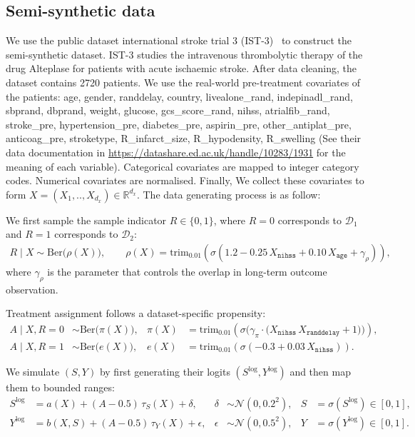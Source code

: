 \documentclass{article}
\theoremstyle{plain}
\theoremstyle{definition}
\theoremstyle{remark}
\newcommand{\1}{\mathds{1}}                %
\begin{document}
\subsection{Semi-synthetic data}
\label{app:semi-synthetic}
We use the public dataset international stroke trial 3 (IST-3)~\cite{Sandercock.2008-IST} to construct the semi-synthetic dataset. IST-3 studies the intravenous thrombolytic therapy of the drug Alteplase for patients with acute ischaemic stroke. After data cleaning, the dataset contains 2720 patients. We use the real-world pre-treatment covariates of the patients: age, gender, randdelay, country, livealone\_rand, indepinadl\_rand, sbprand, dbprand, weight, glucose, gcs\_score\_rand, nihss, atrialfib\_rand, stroke\_pre, hypertension\_pre, diabetes\_pre, aspirin\_pre, other\_antiplat\_pre, anticoag\_pre, stroketype, R\_infarct\_size, R\_hypodensity, R\_swelling (See their data documentation in \href{https://datashare.ed.ac.uk/handle/10283/1931}{https://datashare.ed.ac.uk/handle/10283/1931} for the meaning of each variable). Categorical covariates are mapped to integer category codes. Numerical covariates are normalised. Finally, We collect these covariates to form $X=(X_1,..,X_{d_x}) \in \mathbb{R}^{d_x}$. The data generating process is as follow:

We first sample the sample indicator $R\in\{0,1\}$, where $R=0$ corresponds to $\mathcal D_1$ and $R=1$ corresponds to $\mathcal D_2$:
\begin{align}
  R \mid X \sim \mathrm{Ber}\big(\rho(X)\big),
  \qquad
  \rho(X)=\mathrm{trim}_{0.01}\!\left(\sigma\!\left(1.2 - 0.25\,X_{\texttt{nihss}} + 0.10\,X_{\texttt{age}} + \gamma_\rho\right)\right),
\end{align}
where $\gamma_\rho$ is the parameter that controls the overlap in long-term outcome observation.

Treatment assignment follows a dataset-specific propensity:
\begin{align}
  A \mid X,R=0 &\sim \mathrm{Ber}\big(\pi(X)\big),
  &
  \pi(X)
&=\mathrm{trim}_{0.01}\!\left(\sigma\Big(\gamma_\pi\cdot\big(X_{\texttt{nihss}}\,X_{\texttt{randdelay}}+1\big)\Big)\right),
  \\
  A \mid X,R=1 &\sim \mathrm{Ber}\big(e(X)\big),
  &
  e(X)
  &=\mathrm{trim}_{0.01}\!\left(\sigma\!\left(-0.3+0.03\,X_{\texttt{nihss}}\right)\right).
\end{align}

We simulate $(S,Y)$ by first generating their logits $(S^{\mathrm{log}},Y^{\mathrm{log}})$ and then map them to bounded ranges:
\begin{align}
  S^{\mathrm{log}} &= a(X) + (A-0.5)\,\tau_S(X) + \delta,
  & \delta &\sim \mathcal N(0,0.2^2),
  & S &= \sigma\!\left(S^{\mathrm{log}}\right)\in[0,1],
  \label{eq:ist3-ssm-S}
  \\
  Y^{\mathrm{log}} &= b(X,S) + (A-0.5)\,\tau_Y(X) + \epsilon,
  & \epsilon &\sim \mathcal N(0,0.5^2),
  & Y &= \sigma\!\left(Y^{\mathrm{log}}\right)\in[0,1].
  \label{eq:ist3-ssm-Y}
\end{align}
\end{document}
